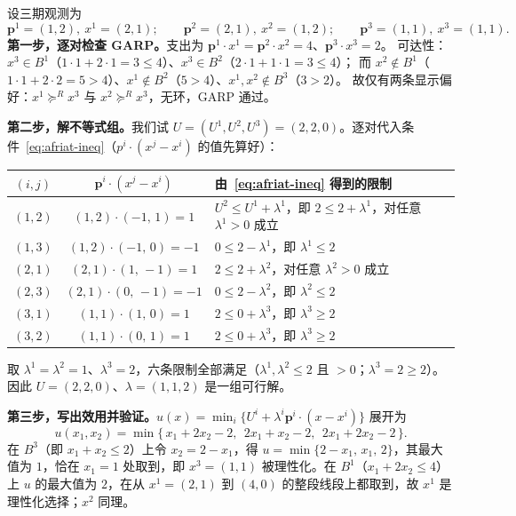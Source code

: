 \begin{example}[三期数据的手算]\label{ex:afriat3}
设三期观测为
\[
\boldsymbol{p}^{1}=(1,2),\ x^{1}=(2,1);\qquad
\boldsymbol{p}^{2}=(2,1),\ x^{2}=(1,2);\qquad
\boldsymbol{p}^{3}=(1,1),\ x^{3}=(1,1).
\]
\textbf{第一步，逐对检查 GARP。}支出为 $\boldsymbol{p}^{1}\!\cdot x^{1}=\boldsymbol{p}^{2}\!\cdot x^{2}=4$、$\boldsymbol{p}^{3}\!\cdot x^{3}=2$。
可达性：$x^{3}\in B^{1}$（$1\cdot1+2\cdot1=3\le 4$）、$x^{3}\in B^{2}$（$2\cdot1+1\cdot1=3\le 4$）；
而 $x^{2}\notin B^{1}$（$1\cdot1+2\cdot2=5>4$）、$x^{1}\notin B^{2}$（$5>4$）、$x^{1},x^{2}\notin B^{3}$（$3>2$）。
故仅有两条显示偏好：$x^{1}\succeq^{R}x^{3}$ 与 $x^{2}\succeq^{R}x^{3}$，无环，GARP 通过。

\textbf{第二步，解不等式组。}我们试 $U=(U^{1},U^{2},U^{3})=(2,2,0)$。逐对代入条件~\eqref{eq:afriat-ineq}（$p^{i}\cdot(x^{j}-x^{i})$ 的值先算好）：

\begin{center}
\small
\begin{tabular}{ccl}
$(i,j)$ & $\boldsymbol{p}^{i}\cdot(x^{j}-x^{i})$ & 由~\eqref{eq:afriat-ineq} 得到的限制 \\ \midrule
$(1,2)$ & $(1,2)\cdot(-1,\,1)=1$ & $U^{2}\le U^{1}+\lambda^{1}$，即 $2\le 2+\lambda^{1}$，对任意 $\lambda^{1}>0$ 成立 \\
$(1,3)$ & $(1,2)\cdot(-1,\,0)=-1$ & $0\le 2-\lambda^{1}$，即 $\lambda^{1}\le 2$ \\
$(2,1)$ & $(2,1)\cdot(1,\,-1)=1$ & $2\le 2+\lambda^{2}$，对任意 $\lambda^{2}>0$ 成立 \\
$(2,3)$ & $(2,1)\cdot(0,\,-1)=-1$ & $0\le 2-\lambda^{2}$，即 $\lambda^{2}\le 2$ \\
$(3,1)$ & $(1,1)\cdot(1,\,0)=1$ & $2\le 0+\lambda^{3}$，即 $\lambda^{3}\ge 2$ \\
$(3,2)$ & $(1,1)\cdot(0,\,1)=1$ & $2\le 0+\lambda^{3}$，即 $\lambda^{3}\ge 2$ \\
\end{tabular}
\end{center}

取 $\lambda^{1}=\lambda^{2}=1$、$\lambda^{3}=2$，六条限制全部满足（$\lambda^{1},\lambda^{2}\le 2$ 且 $>0$；$\lambda^{3}=2\ge 2$）。因此 $U=(2,2,0)$、$\lambda=(1,1,2)$ 是一组可行解。

\textbf{第三步，写出效用并验证。}$u(x)=\min_{i}\{U^{i}+\lambda^{i}\boldsymbol{p}^{i}\cdot(x-x^{i})\}$ 展开为
\[
u(x_{1},x_{2})=\min\bigl\{\,x_{1}+2x_{2}-2,\ \ 2x_{1}+x_{2}-2,\ \ 2x_{1}+2x_{2}-2\,\bigr\}.
\]
在 $B^{3}$（即 $x_{1}+x_{2}\le 2$）上令 $x_{2}=2-x_{1}$，得 $u=\min\{2-x_{1},\,x_{1},\,2\}$，其最大值为 $1$，恰在 $x_{1}=1$ 处取到，即 $x^{3}=(1,1)$ 被理性化。在 $B^{1}$（$x_{1}+2x_{2}\le 4$）上 $u$ 的最大值为 $2$，在从 $x^{1}=(2,1)$ 到 $(4,0)$ 的整段线段上都取到，故 $x^{1}$ 是理性化选择；$x^{2}$ 同理。
\end{example}

